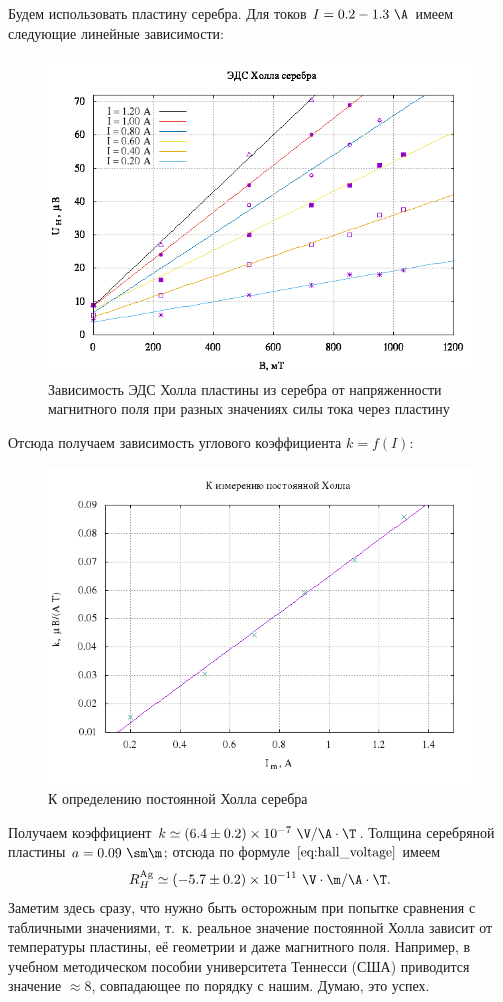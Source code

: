 \documentclass{../lab_class}
\begin{document}
Будем использовать пластину серебра. Для токов $I = 0.2 - 1.3 \ \A$ имеем следующие линейные зависимости:
\begin{figure}[H]
	\centering
	\includegraphics[width = 0.65 \textwidth]{silver.png}
	\caption{Зависимость ЭДС Холла пластины из серебра от напряженности магнитного поля при разных значениях силы тока через пластину}
\end{figure}

Отсюда получаем зависимость углового коэффициента $k = f(I)$:
\begin{figure}[H]
	\centering
	\includegraphics[width = 0.65 \textwidth]{hall_constant.png}
	\caption{К определению постоянной Холла серебра}
\end{figure}

Получаем коэффициент $k \simeq (6.4 \pm 0.2) \times 10^{-7} \ \V / \A \cdot \T$. Толщина серебряной пластины $a = 0.09 \ \sm \m$; отсюда по формуле $\eqref{eq:hall_voltage}$ имеем
\begin{gather*}
	R_H^{\text{Ag}} \simeq (-5.7 \pm 0.2) \times 10^{-11} \ \V \cdot \m / \A \cdot \T.
\end{gather*}
Заметим здесь сразу, что нужно быть осторожным при попытке сравнения с табличными значениями, т.~к. реальное значение постоянной Холла зависит от температуры пластины, её геометрии и даже магнитного поля. Например, в учебном методическом пособии университета Теннесси (США) приводится значение $\approx 8$, совпадающее по порядку с нашим. Думаю, это успех.
\end{document}
